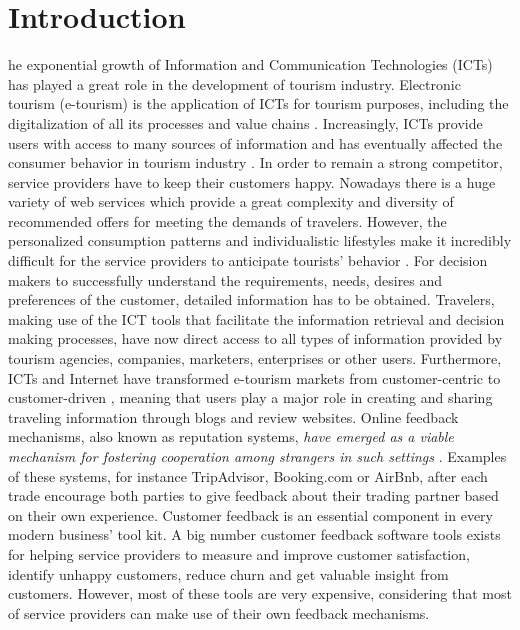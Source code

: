 %
%
\let\textcircled=\pgftextcircled
\chapter{Introduction}
\label{chap:intro}
%
%



he exponential growth of Information and Communication Technologies (ICTs) has played a great role in the development of tourism industry. Electronic tourism (e-tourism) is the application of ICTs for tourism purposes, including the digitalization of all its processes and value chains \cite{buhalis2003etourism}. Increasingly, ICTs provide users with access to many sources of information and has eventually affected the consumer behavior in tourism industry \cite{mills2004handbook}. In order to remain a strong competitor, service providers have to keep their customers happy. Nowadays there is a huge variety of web services which provide a great complexity and diversity of recommended offers for meeting the demands of travelers. However, the personalized consumption patterns and individualistic lifestyles make it incredibly difficult for the service providers to anticipate tourists' behavior \cite{niemann2008enhancing}. For decision makers to successfully understand the requirements, needs, desires and preferences of the customer, detailed information has to be obtained. Travelers, making use of the ICT tools that facilitate the information retrieval and decision making processes, have now direct access to all types of information provided by tourism agencies, companies, marketers, enterprises or other users. Furthermore, ICTs and Internet have transformed e-tourism markets from customer-centric to customer-driven \cite{buhalis2011tourism}, meaning that users play a major role in creating and sharing traveling information through blogs and review websites. Online feedback mechanisms, also known as reputation systems, \textit{have emerged as a viable mechanism for fostering cooperation among strangers in such settings} \cite{dellarocas2003digitization}. Examples of these systems, for instance TripAdvisor, Booking.com or AirBnb, after each trade encourage both parties to give feedback about their trading partner based on their own experience. 
Customer feedback is an essential component in every modern business' tool kit. A big number customer feedback software tools exists for helping service providers to measure and improve customer satisfaction, identify unhappy customers, reduce churn and get valuable insight from customers. However, most of these tools are very expensive, considering that most of service providers can make use of their own feedback mechanisms.
%
